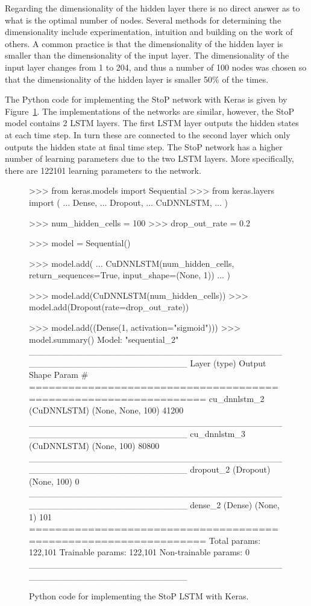 Regarding the dimensionality of the hidden layer there is no direct answer as to
what is the optimal number of nodes. Several methods for determining the
dimensionality include experimentation, intuition and building on the work of
others. A common practice is that the dimensionality of the hidden layer is
smaller than the dimensionality of the input layer. The dimensionality of the
input layer changes from 1 to 204, and thus a number of 100 nodes was chosen
so that the dimensionality of the hidden layer is smaller 50\% of the times.

The Python code for implementing the StoP network with Keras is given by
Figure~\ref{fig:keras_sequence_to_probability}. The implementations of the
networks are similar, however, the StoP model contains 2 LSTM layers. The first
LSTM layer outputs the hidden states at each time step. In turn these are connected to
the second layer which only outputs the hidden state at final time step. The StoP
network has a higher number of learning parameters due to the two LSTM layers.
More specifically, there are 122101 learning parameters to the network.

\begin{figure}[!htbp]
\begin{usagepy}
>>> from keras.models import Sequential
>>> from keras.layers import (
...     Dense,
...     Dropout,
...     CuDNNLSTM,
... )

>>> num_hidden_cells = 100
>>> drop_out_rate = 0.2

>>> model = Sequential()

>>> model.add(
...     CuDNNLSTM(num_hidden_cells, return_sequences=True, input_shape=(None, 1))
... )

>>> model.add(CuDNNLSTM(num_hidden_cells))
>>> model.add(Dropout(rate=drop_out_rate))

>>> model.add((Dense(1, activation="sigmoid")))
>>> model.summary()
Model: "sequential_2"
_________________________________________________________________
Layer (type)                 Output Shape              Param #   
=================================================================
cu_dnnlstm_2 (CuDNNLSTM)     (None, None, 100)         41200     
_________________________________________________________________
cu_dnnlstm_3 (CuDNNLSTM)     (None, 100)               80800     
_________________________________________________________________
dropout_2 (Dropout)          (None, 100)               0         
_________________________________________________________________
dense_2 (Dense)              (None, 1)                 101       
=================================================================
Total params: 122,101
Trainable params: 122,101
Non-trainable params: 0
_________________________________________________________________

\end{usagepy}
\caption{Python code for implementing the StoP LSTM with Keras.}\label{fig:keras_sequence_to_probability}
\end{figure}

